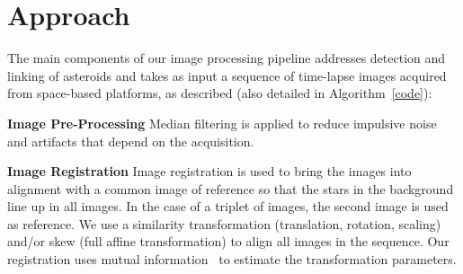 \documentclass{article}
\begin{document}

\section{Approach}
\label{sec:approach}

The main components of our image processing pipeline addresses detection and linking of asteroids and takes as input a sequence of time-lapse images acquired from space-based platforms, as described  (also detailed in 
 Algorithm~\ref{code}):

{\bf Image Pre-Processing}
Median filtering is applied  to reduce impulsive noise and artifacts that depend on the acquisition.

{\bf Image Registration}
Image registration is used to bring the images into alignment with a common image of reference so that the stars in the background line up in all images.  In the case of a triplet of images, the second image is used as reference.  We use a similarity transformation (translation, rotation, scaling) and/or skew (full affine transformation) to align all images in the sequence.  Our registration uses mutual information~\cite{viola1997alignment} to estimate the transformation parameters.
\end{document}
